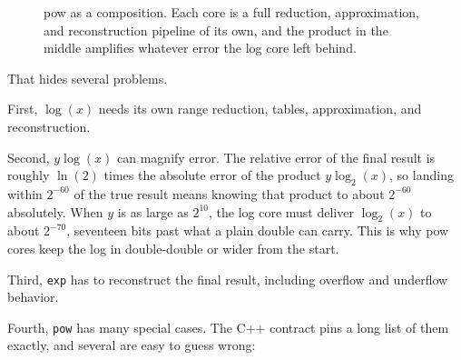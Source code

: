 \documentclass[manuscript, nonacm]{acmart}
\begin{document}
    \begin{figure}[tbp]
        \centering
        \caption{pow as a composition. Each core is a full reduction,
            approximation, and reconstruction pipeline of its own, and the product
            in the middle amplifies whatever error the log core left behind.}
        \label{fig:powcompose}
    \end{figure}

    That hides several problems.

    First, $\log(x)$ needs its own range reduction, tables, approximation, and
    reconstruction.

    Second, $y \log(x)$ can magnify error. The relative error of the final
    result is roughly $\ln(2)$ times the absolute error of the product
    $y \log_2(x)$, so landing within $2^{-60}$ of the true result means
    knowing that product to about $2^{-60}$ absolutely. When $y$ is as
    large as $2^{10}$, the log core must deliver $\log_2(x)$ to about
    $2^{-70}$, seventeen bits past what a plain double can carry. This is
    why pow cores keep the log in double-double or wider from the start.

    Third, \texttt{exp} has to reconstruct the final result, including overflow
    and underflow behavior.

    Fourth, \texttt{pow} has many special cases. The C++ contract pins a
    long list of them exactly, and several are easy to guess wrong:
\end{document}
